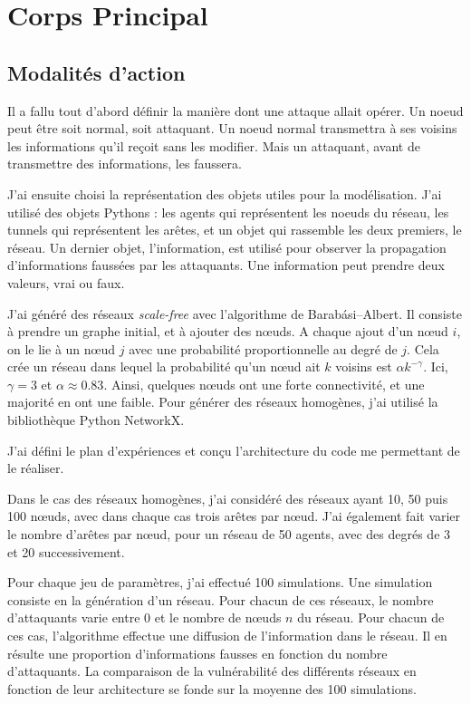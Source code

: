 \documentclass[12pt,a4paper]{article}
\begin{document}
\section{Corps Principal} %

\subsection{Modalités d'action} %

Il a fallu tout d'abord définir la manière dont une attaque allait opérer.
Un noeud peut être soit normal, soit attaquant.
Un noeud normal transmettra à ses voisins les informations qu'il reçoit sans les modifier.
Mais un attaquant, avant de transmettre des informations, les faussera.

J'ai ensuite choisi la représentation des objets utiles pour la modélisation.
J'ai utilisé des objets Pythons : les agents qui représentent les noeuds du réseau, les tunnels qui représentent les arêtes, et un objet qui rassemble les deux premiers, le réseau.
Un dernier objet, l'information, est utilisé pour observer la propagation d'informations faussées par les attaquants.
Une information peut prendre deux valeurs, vrai ou faux.

J'ai généré des réseaux \emph{scale-free} avec l'algorithme de Barabási–Albert.
Il consiste à prendre un graphe initial, et à ajouter des nœuds.
A chaque ajout d'un nœud $i$, on le lie à un nœud $j$ avec une probabilité proportionnelle au degré de $j$.
Cela crée un réseau dans lequel la probabilité qu'un nœud ait $k$ voisins est $\alpha k^{-\gamma}$.
Ici, $\gamma = 3$ et $\alpha \approx 0.83$.
Ainsi, quelques nœuds ont une forte connectivité, et une majorité en ont une faible.
Pour générer des réseaux homogènes, j'ai utilisé la bibliothèque Python NetworkX.

J'ai défini le plan d'expériences et conçu l'architecture du code me permettant de le réaliser.

Dans le cas des réseaux homogènes, j'ai considéré des réseaux ayant 10, 50 puis 100 nœuds, avec dans chaque cas trois arêtes par nœud.
J'ai également fait varier le nombre d'arêtes par nœud, pour un réseau de 50 agents, avec des degrés de 3 et 20 successivement.

Pour chaque jeu de paramètres, j'ai effectué 100 simulations.
Une simulation consiste en la génération d'un réseau.
Pour chacun de ces réseaux, le nombre d'attaquants varie entre 0 et le nombre de nœuds $n$ du réseau.
Pour chacun de ces cas, l'algorithme effectue une diffusion de l'information dans le réseau.
Il en résulte une proportion d'informations fausses en fonction du nombre d'attaquants.
La comparaison de la vulnérabilité des différents réseaux en fonction de leur architecture se fonde sur la moyenne des 100 simulations. 
\end{document}
